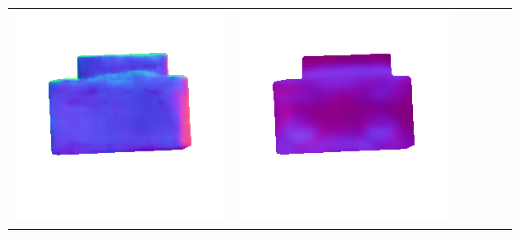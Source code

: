\begin{center}
\begin{tabularx}{\linewidth}{@{}Y@{}Y@{}Y@{}Y@{}Y@{}Y@{}}
\includegraphics[width=\linewidth]{semisynthetic/20150514_19_marrnet_out.png} &
\includegraphics[width=\linewidth]{semisynthetic/20150514_19_ef_out.png} \\

\end{tabularx}
\end{center}
